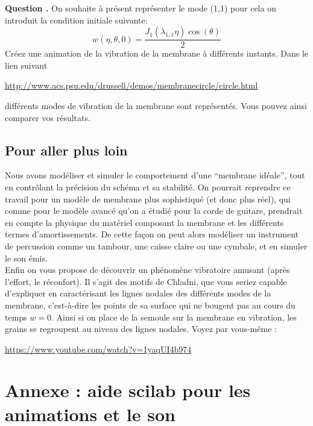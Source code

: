 \documentclass[a4,12pt]{article}
\newcounter{Nbquestion}
\newcommand*\question{%
\stepcounter{Nbquestion}%
\textbf{Question \theNbquestion. }}
\begin{document}


\begin{mdframed}[style=exampledefault]
\question On souhaite à présent représenter le mode (1,1) pour cela on introduit la condition initiale suivante:
\[
w(\eta,\theta,0)=\dfrac{J_1(\lambda_{1,1}\eta)\cos(\theta)}{2}
\]
Créez une animation de la vibration de la membrane à différents instants.
Dans le lien suivant 
\begin{center}
	\url{http://www.acs.psu.edu/drussell/demos/membranecircle/circle.html}
\end{center} 
différents modes de vibration de la membrane sont représentés.
Vous pouvez ainsi comparer  vos résultats.
\end{mdframed}

\subsection{Pour aller plus loin}

Nous avons modéliser et simuler le comportement d'une \enquote{membrane idéale}, tout en contrôlant la précision du schéma et sa stabilité. On pourrait reprendre ce travail pour un modèle de membrane plus sophistiqué (et donc plus réel), qui comme pour le modèle avancé qu'on a étudié pour la corde de guitare, prendrait en compte la physique du matériel composant la membrane et les différents termes d'amortissements. De cette façon on peut alors modéliser un instrument de percussion comme un tambour, une caisse claire ou une cymbale, et en simuler le son émis. \\

Enfin on vous propose de découvrir un phénomène vibratoire amusant (après l'effort, le réconfort). Il s'agit des motifs de Chladni, que vous seriez capable d'expliquer en caractérisant les lignes nodales des différents modes de la membrane, c'est-à-dire les points de sa surface qui ne bougent pas au cours du temps $w=0$. Ainsi si on place de la semoule sur la membrane en vibration, les grains se regroupent au niveau des lignes nodales. Voyez par vous-même :

\begin{center}
	\url{https://www.youtube.com/watch?v=1yaqUI4b974}
\end{center}

\newpage

\section*{Annexe : aide scilab pour les animations et le son}
\end{document}
